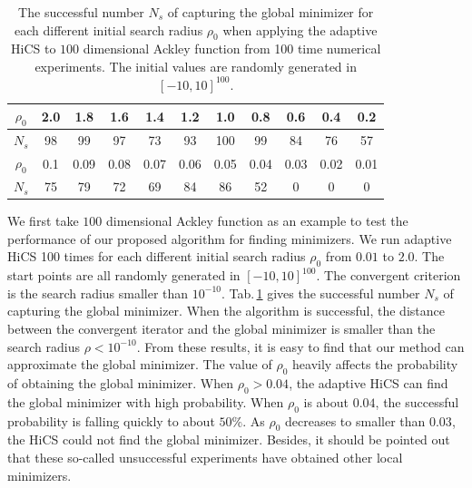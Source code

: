 \documentclass[mathpazo]{csam}
\theoremstyle{remark}
\begin{document}
\begin{table}[!hbpt]
\caption{
The successful number $N_s$ of capturing the global minimizer for
each different initial search radius $\rho_0$ when applying the
adaptive HiCS to $100$ dimensional Ackley function from 100
time numerical experiments. 
The initial values are randomly generated in $[-10,10]^{100}$.
}
\label{tab:ackley100D:AHiCS}
\begin{center}
\begin{tabular}{|c|c|c|c|c|c|c|c|c|c|c|}
 \hline
  $\rho_0$  & 2.0 & 1.8 & 1.6 & 1.4 & 1.2 & 1.0 & 0.8 & 0.6 & 0.4 & 0.2 
 \\\hline
  $N_s$     & 98  & 99  & 97  & 73  & 93  & 100 & 99  & 84  & 76 & 57 
\\\hline \hline
 $\rho_0$ & 0.1 & 0.09 & 0.08 & 0.07 & 0.06 & 0.05 & 0.04 & 0.03& 0.02 & 0.01
 \\\hline
  $N_s$& 75 & 79 & 72 & 69 & 84 &86 & 52 & 0 & 0 & 0
\\ \hline
\end{tabular}
\end{center}
\end{table}
We first take $100$ dimensional Ackley function as an example to
test the performance of our proposed algorithm for finding minimizers. 
We run adaptive HiCS 100 times for each different initial
search radius $\rho_0$ from $0.01$ to $2.0$.
The start points are all randomly generated in $[-10,10]^{100}$.
The convergent criterion is the search radius smaller than $10^{-10}$.
Tab.\,\ref{tab:ackley100D:AHiCS} gives the successful number
$N_s$ of capturing the global minimizer.  
When the algorithm is successful, the distance between the
convergent iterator and the global minimizer is smaller than the
search radius $\rho < 10^{-10}$.
From these results, it is easy to find that our method can
approximate the global minimizer. 
The value of $\rho_0$ heavily affects the probability of
obtaining the global minimizer. 
When $\rho_0 > 0.04$, the adaptive HiCS can find the global
minimizer with high probability. 
When $\rho_0$ is about $0.04$, 
the successful probability is falling quickly to about $50\%$. 
As $\rho_0$ decreases to smaller than $0.03$, the HiCS could not
find the global minimizer.
Besides, it should be pointed out that these so-called unsuccessful
experiments have obtained other local minimizers. 
\end{document}
